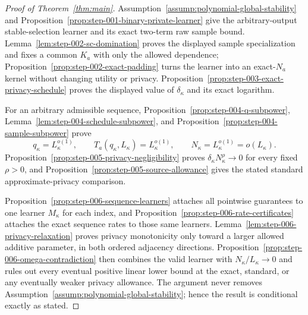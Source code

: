 \begin{proof}[Proof of Theorem~\ref{thm:main}]
Assumption~\ref{assump:polynomial-global-stability} and
Proposition~\ref{prop:step-001-binary-private-learner} give the
arbitrary-output stable-selection learner and its exact two-term raw
sample bound.  Lemma~\ref{lem:step-002-sc-domination} proves the
displayed sample specialization and fixes a common \(K_a\) with only
the allowed dependence; Proposition~\ref{prop:step-002-exact-padding}
turns the learner into an exact-\(N_a\) kernel without changing
utility or privacy.  Proposition~\ref{prop:step-003-exact-privacy-schedule}
proves the displayed value of \(\delta_\kappa\) and its exact
logarithm.

For an arbitrary admissible sequence,
Proposition~\ref{prop:step-004-q-subpower},
Lemma~\ref{lem:step-004-schedule-subpower}, and
Proposition~\ref{prop:step-004-sample-subpower} prove
\[
q_\kappa=L_\kappa^{o(1)},\qquad
T_a(q_\kappa,L_\kappa)=L_\kappa^{o(1)},\qquad
N_\kappa=L_\kappa^{o(1)}=o(L_\kappa).
\]
Proposition~\ref{prop:step-005-privacy-negligibility} proves
\(\delta_\kappa N_\kappa^\rho\to0\) for every fixed \(\rho>0\), and
Proposition~\ref{prop:step-005-source-allowance} gives the stated
standard approximate-privacy comparison.

Proposition~\ref{prop:step-006-sequence-learners} attaches all
pointwise guarantees to one learner \(M_\kappa\) for each index, and
Proposition~\ref{prop:step-006-rate-certificates} attaches the exact
sequence rates to those same learners.  Lemma~\ref{lem:step-006-privacy-relaxation}
proves privacy monotonicity only toward a larger allowed additive
parameter, in both ordered adjacency directions.
Proposition~\ref{prop:step-006-omega-contradiction} then combines the
valid learner with \(N_\kappa/L_\kappa\to0\) and rules out every
eventual positive linear lower bound at the exact, standard, or any
eventually weaker privacy allowance.  The argument never removes
Assumption~\ref{assump:polynomial-global-stability}; hence the result
is conditional exactly as stated.
\end{proof}
